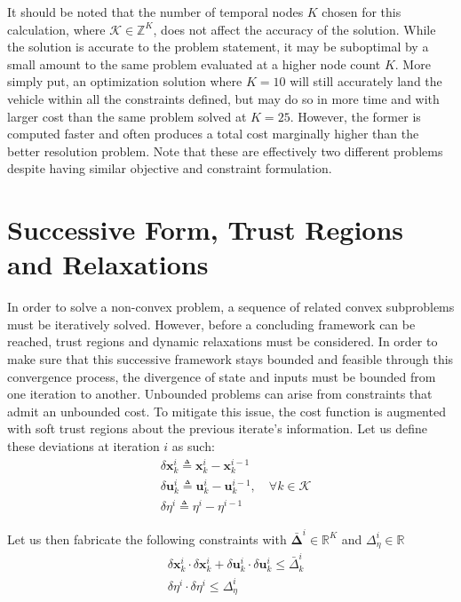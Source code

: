\documentclass[conf]{new-aiaa}
\begin{document}
It should be noted that the number of temporal nodes $K$ chosen for this calculation, where $\mathcal{K} \in \mathbb{Z}^K$, does not affect the accuracy of the solution. While the solution is accurate to the problem statement, it may be suboptimal by a small amount to the same problem evaluated at a higher node count $K$. More simply put, an optimization solution where $K=10$ will still accurately land the vehicle within all the constraints defined, but may do so in more time and with larger cost than the same problem solved at $K=25$. However, the former is computed faster and often produces a total cost marginally higher than the better resolution problem. Note that these are effectively two different problems despite having similar objective and constraint formulation.

\section{Successive Form, Trust Regions and Relaxations}

In order to solve a non-convex problem, a sequence of related convex subproblems must be iteratively solved. However, before a concluding framework can be reached, trust regions and dynamic relaxations must be considered. In order to make sure that this successive framework stays bounded and feasible through this convergence process, the divergence of state and inputs must be bounded from one iteration to another. Unbounded problems can arise from constraints that admit an unbounded cost. To mitigate this issue, the cost function is augmented with soft trust regions about the previous iterate's information. Let us define these deviations at iteration $i$ as such:
\begin{align}
& \delta \mathbf{x}_k^i \triangleq \mathbf{x}_k^i - \mathbf{x}_k^{i-1} \\
& \delta \mathbf{u}_k^i \triangleq \mathbf{u}_k^i - \mathbf{u}_k^{i-1}, \quad \forall k \in \mathcal{K}\\
& \delta \eta^i \triangleq \eta^i - \eta^{i-1}
\end{align}

Let us then fabricate the following constraints with $\bm{\bar{\Delta}}^i \in \mathbb{R}^K$ and $\Delta_\eta^i \in \mathbb{R}$
\begin{align}
& \delta \mathbf{x}_k^i \cdot \delta \mathbf{x}_k^i + \delta \mathbf{u}_k^i \cdot \delta \mathbf{u}_k^i \leq \bar{\Delta}_k^i \\
& \delta \eta^i \cdot \delta \eta^i \leq \Delta_\eta^i
\end{align}
\end{document}
